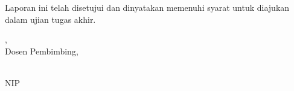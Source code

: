 

\vspace{13.8pt}

\noindent Laporan ini telah disetujui dan dinyatakan memenuhi syarat untuk
diajukan dalam ujian tugas akhir.

\vfill

\noindent\hfill
\begin{minipage}{0.58\textwidth}
  \raggedright
  \NamaKota, \TanggalPersetujuan\\
  Dosen Pembimbing,

  \vspace{1.8cm}

  \underline{\NamaPembimbing}\\
  NIP \NIPPembimbing
\end{minipage}

\vspace{0.8cm}

